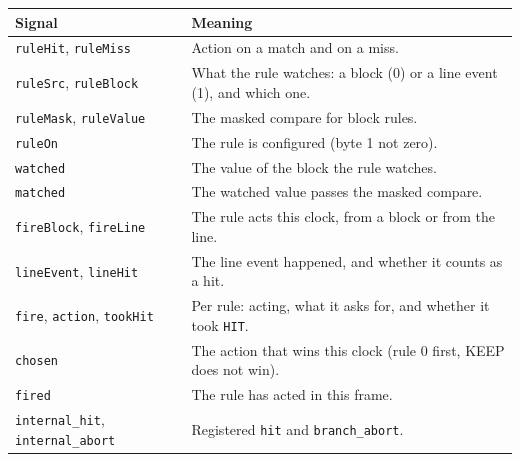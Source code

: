 \documentclass[11pt,a4paper]{article}
\newcommand{\sig}[1]{\texttt{#1}}
\begin{document}
\begin{center}
\begin{tabularx}{\linewidth}{@{}l L@{}}
\toprule
Signal & Meaning \\
\midrule
\sig{ruleHit}, \sig{ruleMiss} & Action on a match and on a miss. \\
\sig{ruleSrc}, \sig{ruleBlock} & What the rule watches: a block (0) or a line event (1), and which one. \\
\sig{ruleMask}, \sig{ruleValue} & The masked compare for block rules. \\
\sig{ruleOn} & The rule is configured (byte 1 not zero). \\
\sig{watched} & The value of the block the rule watches. \\
\sig{matched} & The watched value passes the masked compare. \\
\sig{fireBlock}, \sig{fireLine} & The rule acts this clock, from a block or from the line. \\
\sig{lineEvent}, \sig{lineHit} & The line event happened, and whether it counts as a hit. \\
\sig{fire}, \sig{action}, \sig{tookHit} & Per rule: acting, what it asks for, and whether it took \sig{HIT}. \\
\sig{chosen} & The action that wins this clock (rule 0 first, KEEP does not win). \\
\sig{fired} & The rule has acted in this frame. \\
\sig{internal\_hit}, \sig{internal\_abort} & Registered \sig{hit} and \sig{branch\_abort}. \\
\bottomrule
\end{tabularx}
\end{center}
\end{document}
